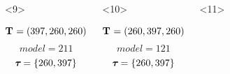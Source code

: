 \begin{frame}
\begin{columns}[c]
\begin{onlyenv}
\begin{minipage}[c][0.5\textheight][c]{\linewidth}
\begin{displaybox}[0.95\linewidth]
\begin{minipage}[c][0.45\textheight][c]{0.95\linewidth}
                    \end{minipage}
                \end{displaybox}
            \end{minipage}
        \end{onlyenv}
        \begin{onlyenv}<9>
            \begin{minipage}[c][0.5\textheight][c]{\linewidth}
                \begin{displaybox}[0.95\linewidth]
                    \begin{minipage}[c][0.45\textheight][c]{0.95\linewidth}
                        \[
                            \mathbf{T_{}} = (397,260,260)
                        \]\vspace{0mm}
                        \[
                            model = 211
                        \]\vspace{0mm}
                        \[
                            \boldsymbol{\tau_{}} = \{260,397\}
                        \]\vspace{0mm}
                    \end{minipage}
                \end{displaybox}
            \end{minipage}
        \end{onlyenv}
        \begin{onlyenv}<10>
            \begin{minipage}[c][0.5\textheight][c]{\linewidth}
                \begin{displaybox}[0.95\linewidth]
                    \begin{minipage}[c][0.45\textheight][c]{0.95\linewidth}
                        \[
                            \mathbf{T_{}} = (260,397,260)
                        \]\vspace{0mm}
                        \[
                            model = 121
                        \]\vspace{0mm}
                        \[
                            \boldsymbol{\tau_{}} = \{260,397\}
                        \]\vspace{0mm}
                    \end{minipage}
                \end{displaybox}
            \end{minipage}
        \end{onlyenv}
        \begin{onlyenv}<11>

\end{onlyenv}
\end{columns}
\end{frame}

